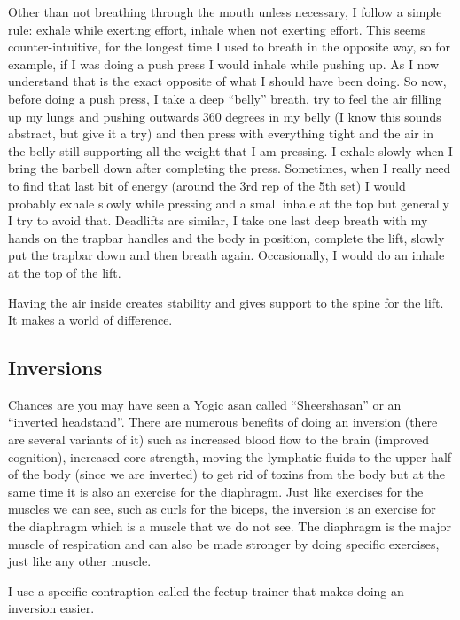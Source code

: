 \documentclass[
  oneside]{book}
\begin{document}
Other than not breathing through the mouth unless necessary, I follow a simple rule: exhale while exerting effort, inhale when not exerting effort. This seems counter-intuitive, for the longest time I used to breath in the opposite way, so for example, if I was doing a push press I would inhale while pushing up. As I now understand that is the exact opposite of what I should have been doing. So now, before doing a push press, I take a deep ``belly'' breath, try to feel the air filling up my lungs and pushing outwards 360 degrees in my belly (I know this sounds abstract, but give it a try) and then press with everything tight and the air in the belly still supporting all the weight that I am pressing. I exhale slowly when I bring the barbell down after completing the press. Sometimes, when I really need to find that last bit of energy (around the 3rd rep of the 5th set) I would probably exhale slowly while pressing and a small inhale at the top but generally I try to avoid that. Deadlifts are similar, I take one last deep breath with my hands on the trapbar handles and the body in position, complete the lift, slowly put the trapbar down and then breath again. Occasionally, I would do an inhale at the top of the lift.

Having the air inside creates stability and gives support to the spine for the lift. It makes a world of difference.

\hypertarget{inversions}{%
\subsection{Inversions}\label{inversions}}

Chances are you may have seen a Yogic asan called ``Sheershasan'' or an ``inverted headstand''. There are numerous benefits of doing an inversion (there are several variants of it) such as increased blood flow to the brain (improved cognition), increased core strength, moving the lymphatic fluids to the upper half of the body (since we are inverted) to get rid of toxins from the body but at the same time it is also an exercise for the diaphragm. Just like exercises for the muscles we can see, such as curls for the biceps, the inversion is an exercise for the diaphragm which is a muscle that we do not see. The diaphragm is the major muscle of respiration and can also be made stronger by doing specific exercises, just like any other muscle.

I use a specific contraption called the feetup trainer that makes doing an inversion easier.
\end{document}
